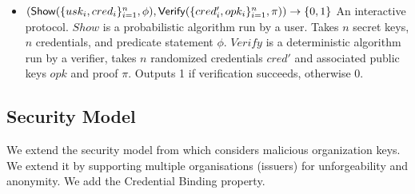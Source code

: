 \begin{itemize}
    \item $(\mathsf{Show}(\{usk_i, cred_i\}_{i=1}^n, \phi), \mathsf{Verify}(\{cred'_i, opk_i\}_{i=1}^n, \pi)) \to \{0,1\}$ An interactive protocol. $Show$ is a probabilistic algorithm run by a user. Takes $n$ secret keys, $n$ credentials, and predicate statement $\phi$. $Verify$ is a deterministic algorithm run by a verifier, takes $n$ randomized credentials $cred'$ and associated public keys $opk$ and proof $\pi$. Outputs 1 if verification succeeds, otherwise 0.

\end{itemize}


\subsection{Security Model}

We extend the security model from \cite{fuchsbauer_structure-preserving_2019} which considers malicious organization keys.
We extend it by supporting multiple organisations (issuers) for unforgeability and anonymity.
We add the Credential Binding property. 
 
